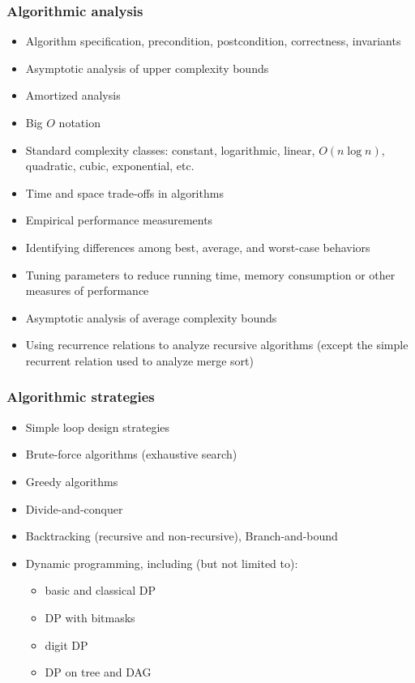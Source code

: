 \documentclass[12pt]{article}
\begin{document}
		\subsubsection{Algorithmic analysis}
		\begin{itemize}[label=]
			\item Algorithm specification, precondition, postcondition, correctness, invariants
			\item Asymptotic analysis of upper complexity bounds
			\item Amortized analysis
			\item Big $O$ notation
			\item Standard complexity classes: constant, logarithmic, linear, $O(n\log{n})$, quadratic, cubic, exponential, etc.
			\item Time and space trade-offs in algorithms
			\item Empirical performance measurements
			\item Identifying differences among best, average, and worst-case behaviors
			\item Tuning parameters to reduce running time, memory consumption or other measures of performance
		\end{itemize}
		
		\begin{itemize}[label=]
			\item Asymptotic analysis of average complexity bounds
			\item Using recurrence relations to analyze recursive algorithms (except the simple recurrent relation used to analyze merge sort)
		\end{itemize}
			
		\subsubsection{Algorithmic strategies}
		\begin{itemize}[label=]
			\item Simple loop design strategies
			\item Brute-force algorithms (exhaustive search)
			\item Greedy algorithms
			\item Divide-and-conquer
			\item Backtracking (recursive and non-recursive), Branch-and-bound
			\item Dynamic programming, including (but not limited to):
				\begin{itemize}[label=$\bullet$,leftmargin=12pt,topsep=-\parskip]
					\item basic and classical DP
					\item DP with bitmasks
					\item digit DP
					\item DP on tree and DAG
				\end{itemize}
		\end{itemize}
	
\end{document}
